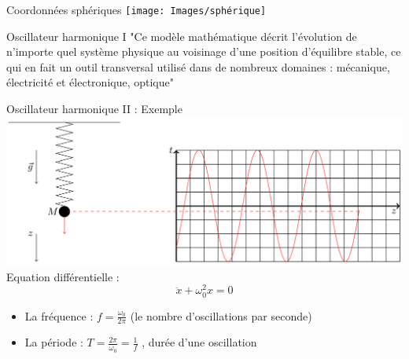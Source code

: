 \documentclass[xcolor=table]{beamer}
\begin{document}
\begin{frame}{Coordonnées sphériques}
    \centering
    \texttt{[image: Images/sphérique]}
\end{frame}

\begin{frame}{Oscillateur harmonique I}
   "Ce modèle mathématique décrit l'évolution de n'importe quel système physique au voisinage d'une position d'équilibre stable, ce qui en fait un outil transversal utilisé dans de nombreux domaines : mécanique, électricité et électronique, optique"
\end{frame}



\begin{frame}{Oscillateur harmonique II : Exemple}
\centering
\includegraphics[scale = 0.5]{Images/ressort}
Equation différentielle : 
\begin{equation*}
\ddot x + \omega_0^2x =  0
\end{equation*}
\begin{itemize}
\item La fréquence : $f=\displaystyle\frac{\omega_{0}}{2\pi}$ (le nombre d'oscillations par seconde) 
\item La période : $T=\displaystyle\frac{2\pi}{\omega_{0}}=\displaystyle\frac{1}{f}$ ,  durée d'une oscillation
\end{itemize}
\end{frame}
\end{document}
